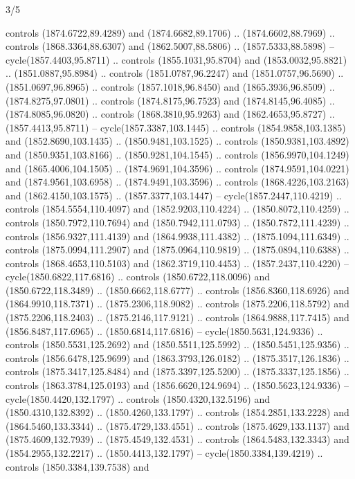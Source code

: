\begin{flagdescription}{3/5}
\begin{scope}[xshift=0.5\flaglength,yshift=0.5\flagwidth,scale=\flagwidth/99]
\begin{scope}[y=0.8pt, x=0.8pt, yscale=-0.20628, xscale=0.20628,shift={(-500,-300)}]
\begin{scope}[cm={{0.79646,0.0,0.0,0.7753,(100.0721,273.79617)}}]
\begin{scope}[cm={{1.1028,0.0,0.0,1.08434,(-41.46868,-11.26981)}}]
  controls (1874.6722,89.4289) and (1874.6682,89.1706) .. (1874.6602,88.7969) ..
  controls (1868.3364,88.6307) and (1862.5007,88.5806) .. (1857.5333,88.5898) --
  cycle(1857.4403,95.8711) .. controls (1855.1031,95.8704) and
  (1853.0032,95.8821) .. (1851.0887,95.8984) .. controls (1851.0787,96.2247) and
  (1851.0757,96.5690) .. (1851.0697,96.8965) .. controls (1857.1018,96.8450) and
  (1865.3936,96.8509) .. (1874.8275,97.0801) .. controls (1874.8175,96.7523) and
  (1874.8145,96.4085) .. (1874.8085,96.0820) .. controls (1868.3810,95.9263) and
  (1862.4653,95.8727) .. (1857.4413,95.8711) -- cycle(1857.3387,103.1445) ..
  controls (1854.9858,103.1385) and (1852.8690,103.1435) .. (1850.9481,103.1525)
  .. controls (1850.9381,103.4892) and (1850.9351,103.8166) ..
  (1850.9281,104.1545) .. controls (1856.9970,104.1249) and (1865.4006,104.1505)
  .. (1874.9691,104.3596) .. controls (1874.9591,104.0221) and
  (1874.9561,103.6958) .. (1874.9491,103.3596) .. controls (1868.4226,103.2163)
  and (1862.4150,103.1575) .. (1857.3377,103.1447) -- cycle(1857.2447,110.4219)
  .. controls (1854.5554,110.4097) and (1852.9203,110.4224) ..
  (1850.8072,110.4259) .. controls (1850.7972,110.7694) and (1850.7942,111.0793)
  .. (1850.7872,111.4239) .. controls (1856.9327,111.4139) and
  (1864.9938,111.4382) .. (1875.1094,111.6349) .. controls (1875.0994,111.2907)
  and (1875.0964,110.9819) .. (1875.0894,110.6388) .. controls
  (1868.4653,110.5103) and (1862.3719,110.4453) .. (1857.2437,110.4220) --
  cycle(1850.6822,117.6816) .. controls (1850.6722,118.0096) and
  (1850.6722,118.3489) .. (1850.6662,118.6777) .. controls (1856.8360,118.6926)
  and (1864.9910,118.7371) .. (1875.2306,118.9082) .. controls
  (1875.2206,118.5792) and (1875.2206,118.2403) .. (1875.2146,117.9121) ..
  controls (1864.9888,117.7415) and (1856.8487,117.6965) .. (1850.6814,117.6816)
  -- cycle(1850.5631,124.9336) .. controls (1850.5531,125.2692) and
  (1850.5511,125.5992) .. (1850.5451,125.9356) .. controls (1856.6478,125.9699)
  and (1863.3793,126.0182) .. (1875.3517,126.1836) .. controls
  (1875.3417,125.8484) and (1875.3397,125.5200) .. (1875.3337,125.1856) ..
  controls (1863.3784,125.0193) and (1856.6620,124.9694) .. (1850.5623,124.9336)
  -- cycle(1850.4420,132.1797) .. controls (1850.4320,132.5196) and
  (1850.4310,132.8392) .. (1850.4260,133.1797) .. controls (1854.2851,133.2228)
  and (1864.5460,133.3344) .. (1875.4729,133.4551) .. controls
  (1875.4629,133.1137) and (1875.4609,132.7939) .. (1875.4549,132.4531) ..
  controls (1864.5483,132.3343) and (1854.2955,132.2217) .. (1850.4413,132.1797)
  -- cycle(1850.3384,139.4219) .. controls (1850.3384,139.7538) and

\end{scope}
\end{scope}
\end{scope}
\end{scope}
\end{flagdescription}
